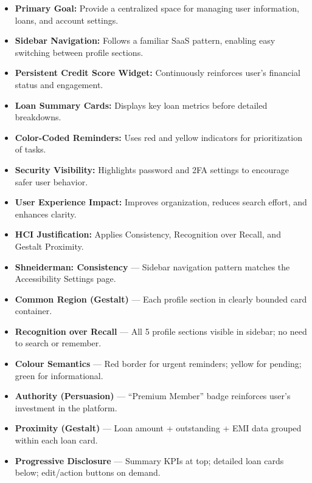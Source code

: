 \documentclass[11pt,a4paper]{article}
\newcommand{\ptag}[1]{\colorbox{tagbg}{\textcolor{tagtxt}{\textbf{\small #1}}}}
\begin{document}
\begin{itemize}[leftmargin=1.5em,itemsep=4pt]

\item \textbf{Primary Goal:}
Provide a centralized space for managing user information, loans, and account settings.

\item \textbf{Sidebar Navigation:}
Follows a familiar SaaS pattern, enabling easy switching between profile sections.

\item \textbf{Persistent Credit Score Widget:}
Continuously reinforces user’s financial status and engagement.

\item \textbf{Loan Summary Cards:}
Displays key loan metrics before detailed breakdowns.

\item \textbf{Color-Coded Reminders:}
Uses red and yellow indicators for prioritization of tasks.

\item \textbf{Security Visibility:}
Highlights password and 2FA settings to encourage safer user behavior.

\item \textbf{User Experience Impact:}
Improves organization, reduces search effort, and enhances clarity.

\item \textbf{HCI Justification:}
Applies Consistency, Recognition over Recall, and Gestalt Proximity.

\end{itemize}
\begin{hcimap}
\begin{itemize}[leftmargin=1.2em,itemsep=2pt]
  \item \ptag{Shneiderman: Consistency} --- Sidebar navigation pattern matches the Accessibility Settings page.
  \item \ptag{Common Region (Gestalt)} --- Each profile section in clearly bounded card container.
  \item \ptag{Recognition over Recall} --- All 5 profile sections visible in sidebar; no need to search or remember.
  \item \ptag{Colour Semantics} --- Red border for urgent reminders; yellow for pending; green for informational.
  \item \ptag{Authority (Persuasion)} --- ``Premium Member'' badge reinforces user's investment in the platform.
  \item \ptag{Proximity (Gestalt)} --- Loan amount + outstanding + EMI data grouped within each loan card.
  \item \ptag{Progressive Disclosure} --- Summary KPIs at top; detailed loan cards below; edit/action buttons on demand.
\end{itemize}
\end{hcimap}
\end{document}
